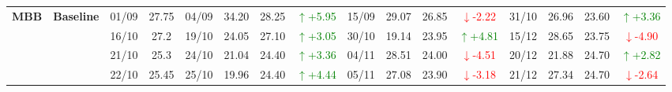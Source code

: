 {\begin{longtable}{llcc|cccc|cccc|cccc}
\multirow{4}{*}{\textbf{MBB}}
& \textbf{Baseline}
& 01/09 & 27.75 & 04/09 & 34.20 & 28.25 & \textcolor{green}{\(\uparrow\)+5.95} & 15/09 & 29.07 & 26.85 & \textcolor{red}{\(\downarrow\)-2.22} & 31/10 & 26.96 & 23.60 & \textcolor{green}{\(\uparrow\)+3.36} \\
& & 16/10 & 27.2 & 19/10 & 24.05 & 27.10 & \textcolor{green}{\(\uparrow\)+3.05} & 30/10 & 19.14 & 23.95 & \textcolor{green}{\(\uparrow\)+4.81} & 15/12 & 28.65 & 23.75 & \textcolor{red}{\(\downarrow\)-4.90} \\
& & 21/10 & 25.3 & 24/10 & 21.04 & 24.40 & \textcolor{green}{\(\uparrow\)+3.36} & 04/11 & 28.51 & 24.00 & \textcolor{red}{\(\downarrow\)-4.51} & 20/12 & 21.88 & 24.70 & \textcolor{green}{\(\uparrow\)+2.82} \\
& & 22/10 & 25.45 & 25/10 & 19.96 & 24.40 & \textcolor{green}{\(\uparrow\)+4.44} & 05/11 & 27.08 & 23.90 & \textcolor{red}{\(\downarrow\)-3.18} & 21/12 & 27.34 & 24.70 & \textcolor{red}{\(\downarrow\)-2.64} \\
\midrule

\end{longtable}
}